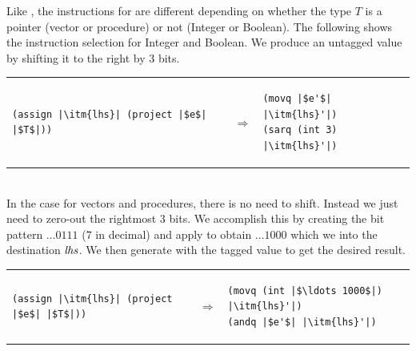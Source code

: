 \documentclass[11pt]{book}
\begin{document}
Like , the instructions for  are
different depending on whether the type $T$ is a pointer (vector or
procedure) or not (Integer or Boolean). The following shows the
instruction selection for Integer and Boolean.  We produce an untagged
value by shifting it to the right by 3 bits.
%
\\
\begin{tabular}{lll}
\begin{minipage}{0.4\textwidth}
\begin{lstlisting}
(assign |\itm{lhs}| (project |$e$| |$T$|))
\end{lstlisting}
\end{minipage}
&
$\Rightarrow$
&
\begin{minipage}{0.5\textwidth}
\begin{lstlisting}
(movq |$e'$| |\itm{lhs}'|)
(sarq (int 3) |\itm{lhs}'|)
\end{lstlisting}
\end{minipage}
\end{tabular}  \\
%
In the case for vectors and procedures, there is no need to
shift. Instead we just need to zero-out the rightmost 3 bits. We
accomplish this by creating the bit pattern $\ldots 0111$ ($7$ in
decimal) and apply  to obtain $\ldots 1000$ which we
 into the destination $\mathit{lhs}$.  We then generate
 with the tagged value to get the desired result. \\
%
\begin{tabular}{lll}
\begin{minipage}{0.4\textwidth}
\begin{lstlisting}
(assign |\itm{lhs}| (project |$e$| |$T$|))
\end{lstlisting}
\end{minipage}
&
$\Rightarrow$
&
\begin{minipage}{0.5\textwidth}
\begin{lstlisting}
(movq (int |$\ldots 1000$|) |\itm{lhs}'|)
(andq |$e'$| |\itm{lhs}'|)
\end{lstlisting}
\end{minipage}
\end{tabular}  

\end{document}

